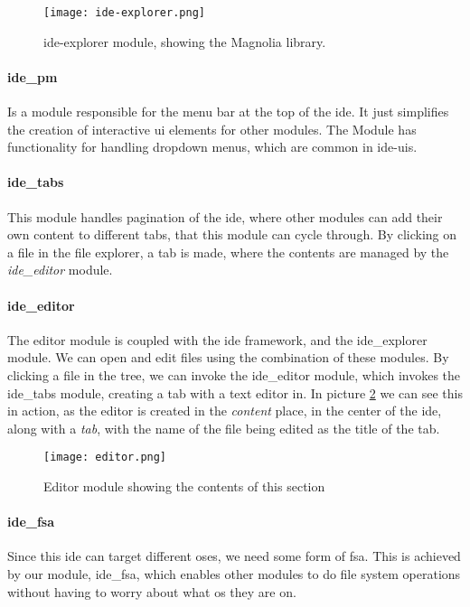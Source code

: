\begin{figure}[H]
  \centering
  \texttt{[image: ide-explorer.png]}
  \caption{
    \gls*{ide}-explorer module, showing the Magnolia library.
  }
  \label{pic:ideEx}
\end{figure}


\paragraph{ide\_pm} Is a module responsible for the menu bar at the top of the
\gls*{ide}. It just simplifies the creation of interactive \gls*{ui} elements
for other modules. The Module has functionality for handling dropdown menus,
which are common in \gls*{ide}-\gls*{ui}s.

\paragraph{ide\_tabs} This module handles pagination of the \gls*{ide}, where
other modules can add their own content to different tabs, that this module can
cycle through. By clicking on a file in the file explorer, a tab is made, where
the contents are managed by the \textit{ide\_editor} module.

\paragraph{ide\_editor} The editor module is coupled with the \gls*{ide}
framework, and the ide\_explorer module. We can open and edit files using the
combination of these modules. By clicking a file in the tree, we can invoke the
ide\_editor module, which invokes the ide\_tabs module, creating a tab with a
text editor in. In picture \ref{pic:editorModule} we can see this in action, as
the editor is created in the \textit{content} place, in the center of the
\gls*{ide}, along with a \textit{tab}, with the name of the file being edited as
the title of the tab.

\begin{figure}[H]
  \centering
  \texttt{[image: editor.png]}
  \caption{
    Editor module showing the contents of this section
  }
  \label{pic:editorModule}
\end{figure}

\paragraph{ide\_fsa} Since this \gls*{ide} can target different \gls*{os}es, we
need some form of \gls*{fsa}. This is achieved by our module, ide\_fsa, which
enables other modules to do file system operations without having to worry about
what \gls*{os} they are on.


